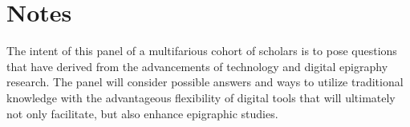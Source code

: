 \documentclass[amsthm,ebook]{saparticle}
\begin{document}
\section{Notes}
The intent of this panel of a multifarious cohort of scholars is to pose questions that have derived from the advancements of technology and digital epigraphy research. The panel will consider possible answers and ways to utilize traditional knowledge with the advantageous flexibility of digital tools that will ultimately not only facilitate, but also enhance epigraphic studies.
\end{document}
